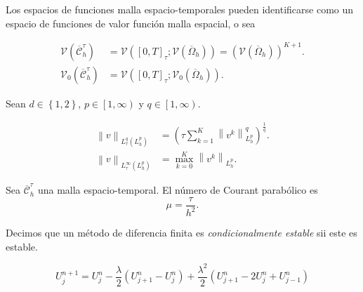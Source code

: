 Los espacios de funciones malla espacio-temporales pueden
identificarse como un espacio de funciones de valor función malla
espacial, o sea

\begin{align*}
	\mathcal{V}
	\left(
	\overline{\mathcal{C}}^{\tau}_{h}
	\right) & =
	\mathcal{V}
	\left(
	\left[0,T\right]_{\tau};
	\mathcal{V}
	\left(\overline{\Omega}_{h}\right)
	\right)=
	{
	\left(
	\mathcal{V}\left(\overline{\Omega}_{h}\right)
	\right)
	}^{K+1}.    \\
	\mathcal{V}_{0}
	\left(
	\overline{\mathcal{C}}^{\tau}_{h}
	\right) & =
	\mathcal{V}
	\left(
	\left[0,T\right]_{\tau};
	\mathcal{V}_{0}\left(\overline{\Omega}_{h}\right)
	\right).
\end{align*}

\begin{definition}
	Sean
	\begin{math}
		d\in\left\{1,2\right\}
	\end{math},
	\begin{math}
		p\in
		\left[1,\infty\right)
	\end{math}
	y
	\begin{math}
		q\in\left[1,\infty\right)
	\end{math}.

	\begin{align*}
		{\left\|v\right\|}_{
			L^{q}_{\tau}\left(L^{p}_{h}\right)
		}
		 & =
		{\left(
		\tau\sum_{k=1}^{K}
		\left\|v^{k}\right\|^{q}_{L^{p}_{h}}
		\right)}^{\frac{1}{q}}. \\
		{\left\|v\right\|}_{L^{\infty}_{\tau}\left(L^{p}_{h}\right)}
		 & =
		\max^{K}_{k=0}
		{\left\|v^{k}\right\|}_{L^{p}_{h}}.
	\end{align*}
\end{definition}

\begin{definition}
	Sea $\overline{\mathcal{C}}^{\tau}_{h}$ una malla
	espacio-temporal.
	El número de Courant parabólico es
	\begin{equation*}
		\mu=
		\dfrac{\tau}{h^{2}}.
	\end{equation*}
\end{definition}

\begin{definition}
	Decimos que un método de diferencia finita es
	\emph{condicionalmente estable} sii este es estable.
\end{definition}

\begin{equation*}
	U^{n+1}_{j}=
	U^{n}_{j}-
	\dfrac{\lambda}{2}
	\left(U^{n}_{j+1}-U^{n}_{j}\right)+
	\dfrac{\lambda^{2}}{2}
	\left(
	U^{n}_{j+1}-
	2U^{n}_{j}+
	U^{n}_{j-1}
	\right)
\end{equation*}

